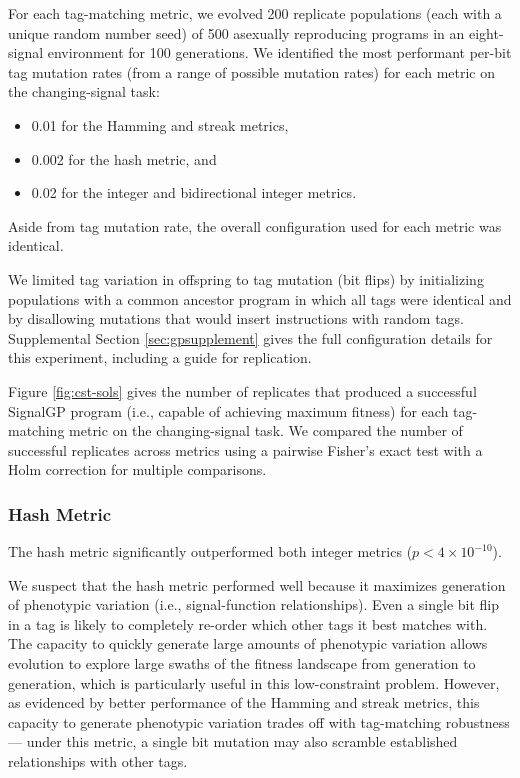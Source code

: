 For each tag-matching metric, we evolved 200 replicate populations (each with a unique random number seed) of 500 asexually reproducing programs in an eight-signal environment for 100 generations.
We identified the most performant per-bit tag mutation rates (from a range of possible mutation rates) for each metric on the changing-signal task:
\begin{itemize}
    \item 0.01 for the Hamming and streak metrics,
    \item 0.002 for the hash metric, and
    \item 0.02 for the integer and bidirectional integer metrics.
\end{itemize}
Aside from tag mutation rate, the overall configuration used for each metric was identical.

We limited tag variation in offspring to tag mutation (bit flips) by initializing populations with a common ancestor program in which all tags were identical and by disallowing mutations that would insert instructions with random tags.
Supplemental Section \ref{sec:gpsupplement} gives the full configuration details for this experiment, including a guide for replication.

% 

Figure \ref{fig:cst-sols} gives the number of replicates that produced a successful SignalGP program (i.e., capable of achieving maximum fitness) for each tag-matching metric on the changing-signal task.
We compared the number of successful replicates across metrics using a pairwise Fisher's exact test with a Holm correction for multiple comparisons.

\subsubsection{Hash Metric}

The hash metric significantly outperformed both integer metrics ($p < 4\times10^{-10}$).

We suspect that the hash metric performed well because it maximizes generation of phenotypic variation (i.e., signal-function relationships).
Even a single bit flip in a tag is likely to completely re-order which other tags it best matches with.
The capacity to quickly generate large amounts of phenotypic variation allows evolution to explore large swaths of the fitness landscape from generation to generation, which is particularly useful in this low-constraint problem.
However, as evidenced by better performance of the Hamming and streak metrics, this capacity to generate phenotypic variation trades off with tag-matching robustness --- under this metric, a single bit mutation may also scramble established relationships with other tags.

